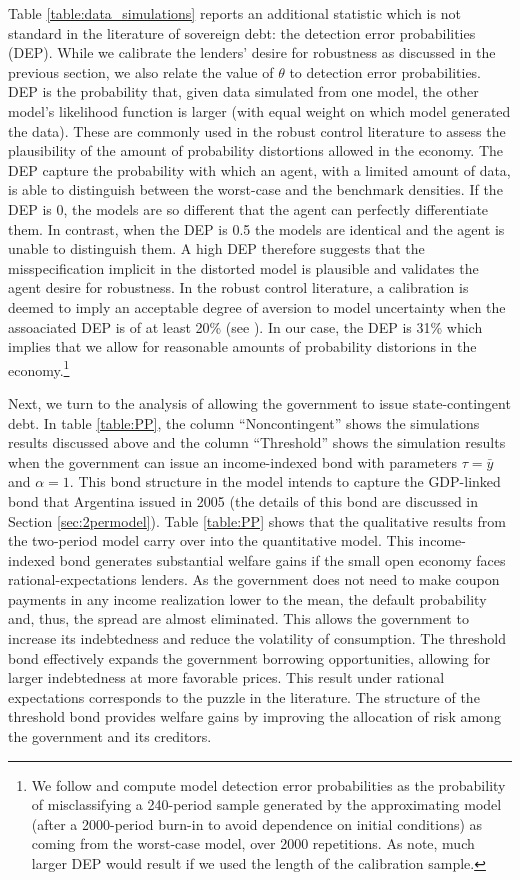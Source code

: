 Table \ref{table:data_simulations} reports an additional statistic which is not standard in the literature of sovereign debt: the detection error probabilities (DEP). While we calibrate the lenders' desire for robustness as discussed in the previous section, we also relate the value of $\theta$ to detection error probabilities. DEP is the probability that, given data simulated from one model, the other model’s likelihood function is larger (with equal weight on which model generated the data). These are commonly used in the robust control literature to assess the plausibility of the amount of probability distortions allowed in the economy. The DEP capture the probability with which an agent, with a limited amount of data, is able to distinguish between the worst-case and the benchmark densities. If the DEP is 0, the models are so different that the agent can perfectly differentiate them. In contrast, when the DEP is 0.5 the models are identical and the agent is unable to distinguish them. A high DEP therefore suggests that the misspecification implicit in the distorted model is plausible and validates the agent desire for robustness. In the robust control literature, a calibration is deemed to imply an acceptable degree of aversion to model uncertainty when the assoaciated DEP is of at least 20\% (see \citealp{BarillasHansenSargent}). In our case, the DEP is 31\% which implies that we allow for reasonable amounts of probability distorions in the economy.\footnote{We follow \citet{BarillasHansenSargent} and compute model detection error probabilities as the probability of misclassifying a 240-period sample generated by the approximating model (after a 2000-period burn-in to avoid dependence on initial conditions) as coming from the worst-case model, over 2000 repetitions. As \citet{PouzoPresno2016} note, much larger DEP would result if we used the length of the calibration sample.}

Next, we turn to the analysis of allowing the government to issue state-contingent debt. In table \ref{table:PP}, the column ``Noncontingent'' shows the simulations results discussed above and the column ``Threshold'' shows the simulation results when the government can issue an income-indexed bond with parameters $\tau = \bar{y}$ and $\alpha = 1$. This bond structure in the model intends to capture the GDP-linked bond that Argentina issued in 2005 (the details of this bond are discussed in Section \ref{sec:2permodel}). Table \ref{table:PP} shows that the qualitative results from the two-period model carry over into the quantitative model. This income-indexed bond generates substantial welfare gains if the small open economy faces rational-expectations lenders. As the government does not need to make coupon payments in any income realization lower to the mean, the default probability and, thus, the spread are almost eliminated. This allows the government to increase its indebtedness and reduce the volatility of consumption. The threshold bond effectively expands the government borrowing opportunities, allowing for larger indebtedness at more favorable prices. This result under rational expectations corresponds to the puzzle in the literature. The structure of the threshold bond provides welfare gains by improving the allocation of risk among the government and its creditors.
  
